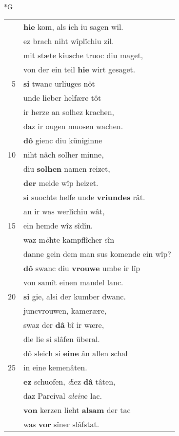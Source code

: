 \documentclass[8pt,a4paper,notitlepage]{article}
\begin{document}
\begin{table}[ht]
\begin{minipage}[t]{0.5\linewidth}
\small
\begin{center}*G
\end{center}
\begin{tabular}{rl}
 & \textbf{hie} kom, als ich iu sagen wil.\\ 
 & ez brach niht wîplîchiu zil.\\ 
 & mit stæte kiusche truoc diu maget,\\ 
 & von der ein teil \textbf{hie} wirt gesaget.\\ 
5 & \textbf{si} twanc urliuges nôt\\ 
 & unde lieber helfære tôt\\ 
 & ir herze an solhez krachen,\\ 
 & daz ir ougen muosen wachen.\\ 
 & \textbf{dô} gienc diu küniginne\\ 
10 & niht nâch solher minne,\\ 
 & diu \textbf{solhen} namen reizet,\\ 
 & \textbf{der} meide wîp heizet.\\ 
 & si suochte helfe unde \textbf{vriundes} rât.\\ 
 & an ir was werlîchiu wât,\\ 
15 & ein hemde wîz sîdîn.\\ 
 & waz m\textit{ö}hte kampflîcher sîn\\ 
 & danne gein dem man sus komende ein wîp?\\ 
 & \textbf{dô} swanc diu \textbf{vrouwe} umbe ir lîp\\ 
 & von samît einen mandel lanc.\\ 
20 & \textbf{si} gie, alsi der kumber dwanc.\\ 
 & juncvrouwen, kamerære,\\ 
 & swaz der \textbf{dâ} bî ir wære,\\ 
 & die lie si slâfen überal.\\ 
 & dô sleich si \textbf{eine} ân allen schal\\ 
25 & in eine kemenâten.\\ 
 & \textbf{ez} schuofen, \textit{d}iez \textbf{dâ} tâten,\\ 
 & daz Parcival \textit{alein}e lac.\\ 
 & \textbf{von} kerzen lieht \textbf{alsam} der tac\\ 
 & was \textbf{vor} sîner slâfstat.\\ 

\end{tabular}
\end{minipage}
\end{table}
\end{document}
